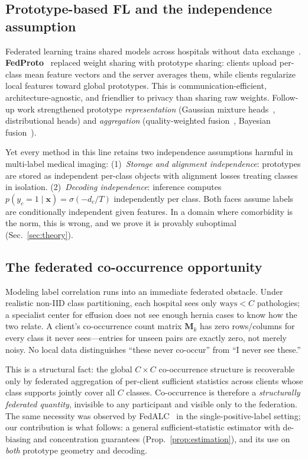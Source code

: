 \documentclass[10pt,twocolumn,letterpaper]{article}
\theoremstyle{definition}
\begin{document}
\subsection{Prototype-based FL and the independence assumption}

Federated learning trains shared models across hospitals without data exchange~\cite{mcmahan2017fedavg}. \textbf{FedProto}~\cite{tan2022fedproto} replaced weight sharing with prototype sharing: clients upload per-class mean feature vectors and the server averages them, while clients regularize local features toward global prototypes. This is communication-efficient, architecture-agnostic, and friendlier to privacy than sharing raw weights. Follow-up work strengthened prototype \emph{representation} (Gaussian mixture heads~\cite{zhang2024fedgmkd}, distributional heads) and \emph{aggregation} (quality-weighted fusion~\cite{zhang2024fedgmkd}, Bayesian fusion~\cite{chen2021fedbe}).

Yet every method in this line retains two independence assumptions harmful in multi-label medical imaging: (1)~\emph{Storage and alignment independence}: prototypes are stored as independent per-class objects with alignment losses treating classes in isolation. (2)~\emph{Decoding independence}: inference computes $p(y_c{=}1\mid \mathbf{x})=\sigma(-d_c/T)$ independently per class. Both faces assume labels are conditionally independent given features. In a domain where comorbidity is the norm, this is wrong, and we prove it is provably suboptimal (Sec.~\ref{sec:theory}).

\subsection{The federated co-occurrence opportunity}

Modeling label correlation runs into an immediate federated obstacle. Under realistic non-IID class partitioning, each hospital sees only $\text{ways}<C$ pathologies; a specialist center for effusion does not see enough hernia cases to know how the two relate. A client's co-occurrence count matrix $\mathbf{M}_k$ has zero rows/columns for every class it never sees---entries for unseen pairs are exactly zero, not merely noisy. No local data distinguishes ``these never co-occur'' from ``I never see these.''

This is a structural fact: the global $C{\times}C$ co-occurrence structure is recoverable only by federated aggregation of per-client sufficient statistics across clients whose class supports jointly cover all $C$ classes. Co-occurrence is therefore a \emph{structurally federated quantity}, invisible to any participant and visible only to the federation. The same necessity was observed by FedALC~\cite{an2024fedalc} in the single-positive-label setting; our contribution is what follows: a general sufficient-statistic estimator with de-biasing and concentration guarantees (Prop.~\ref{prop:estimation}), and its use on \emph{both} prototype geometry and decoding.
\end{document}
